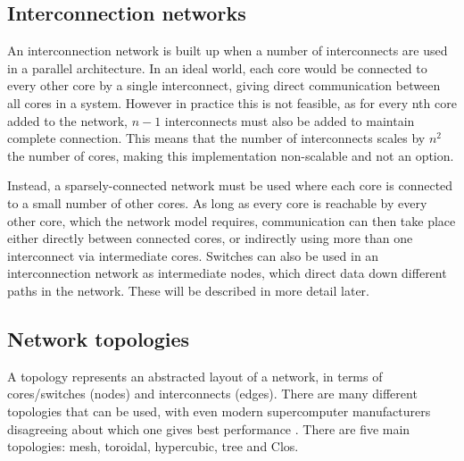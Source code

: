 \documentclass[a4paper, 12pt]{article}
\begin{document}
\subsection{Interconnection networks}

An interconnection network is built up when a number of interconnects are used in a parallel architecture. In an ideal world, each core would be connected to every other core by a single interconnect, giving direct communication between all cores in a system. However in practice this is not feasible, as for every nth core added to the network, $n-1$ interconnects must also be added to maintain complete connection. This means that the number of interconnects scales by $n^2$ the number of cores, making this implementation non-scalable and not an option.

Instead, a sparsely-connected network must be used where each core is connected to a small number of other cores. As long as every core is reachable by every other core, which the network model requires, communication can then take place either directly between connected cores, or indirectly using more than one interconnect via intermediate cores. Switches can also be used in an interconnection network as intermediate nodes, which direct data down different paths in the network. These will be described in more detail later.

\subsection{Network topologies}

A topology represents an abstracted layout of a network, in terms of cores/switches (nodes) and interconnects (edges). There are many different topologies that can be used, with even modern supercomputer manufacturers disagreeing about which one gives best performance \cite{Han14}. There are five main topologies: mesh, toroidal, hypercubic, tree and Clos.
\end{document}
